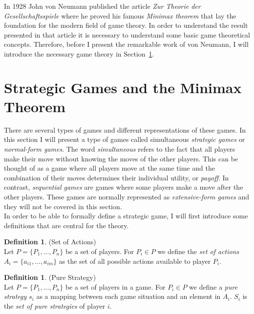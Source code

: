 \documentclass{article}
\theoremstyle{definition}
\newtheorem{definition}[theorem]{Definition}
\theoremstyle{remark}
\begin{document}
    In 1928 John von Neumann published the article \emph{Zur
      Theorie der Gesellschaftsspiele} where he proved his famous
    \emph{Minimax theorem} that lay the foundation for the modern
    field of game theory. In order to understand the result presented
    in that article it is necessary to understand some basic game
    theoretical concepts. Therefore, before I present the remarkable
    work of von Neumann, I will introduce the necessary game theory in
    Section~\ref{Strategic Games}. 
  
\section{Strategic Games and the Minimax Theorem}\label{Strategic Games}
There are several types of games and different representations of
these games. In this section I will present a type of games called
simultaneous \emph{strategic games} or \emph{normal-form
  games}. The word \emph{simultaneous} refers to the fact that all
players make their move without knowing the moves of the other
players. This can be thought of as a game where all players move at
the same time and the combination of their moves determines their
individual utility, or \emph{payoff}. In contrast, \emph{sequential
  games} are games where some players make a move after the other
players. These games are normally represented as \emph{extensive-form
  games} and they will not be covered in this section. \\

In order to be able to formally define a strategic game, I
will first introduce some definitions that are central for the
theory.

\begin{definition} (Set of Actions) \label{Set of actions}\\
  Let $P = \{P_1,...,P_n\}$ be a set of players. For $P_i
  \in P$ we define the \emph{set of actions} $A_i =
  \{a_{i1},...,a_{im}\}$ as the set of all possible actions available
  to player $P_i$. 
  \end{definition}

\begin{definition} (Pure Strategy) \label{Strategy}\\
  Let $P = \{P_1,...,P_n\}$ be a set of players in a game. For $P_i
  \in P$ we define a \emph{pure strategy} $s_i$ as a mapping between each
  game situation and an element in $A_i$. $S_i$ is the \emph{set of
    pure strategies} of player $i$.
\end{definition}
\end{document}
